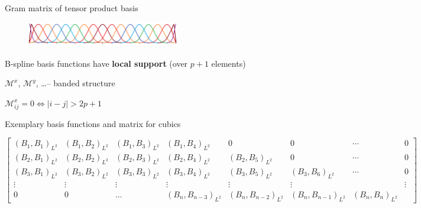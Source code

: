 \documentclass[c]{beamer}
\newcommand{\Prod}[2]{(#1, #2)_{L^2}}
\begin{document}
\begin{frame}{Gram matrix of tensor product basis}

\begin{figure}
  \centering
  \includegraphics[width=0.6\textwidth]{img/Bsplines}
\end{figure}

B-spline basis functions have \textbf{local support} (over $p+1$ elements) 

$\mathcal{M}^x$, $\mathcal{M}^y$, \ldots -- banded structure

$\mathcal{M}^x_{ij} = 0 \iff |i - j| > 2p + 1$

Exemplary basis functions and matrix for cubics

\begin{tiny}
\begin{equation*}
	\begin{bmatrix}
    \Prod{B_1}{B_1} & \Prod{B_1}{B_2} & \Prod{B_1}{B_3} & \Prod{B_1}{B_4} & 0 & 0 & \cdots & 0 \\
    \Prod{B_2}{B_1} & \Prod{B_2}{B_2} & \Prod{B_2}{B_3} & \Prod{B_2}{B_4} & \Prod{B_2}{B_5} & 0 & \cdots & 0 \\
    \Prod{B_3}{B_1} & \Prod{B_3}{B_2} & \Prod{B_3}{B_3} & \Prod{B_3}{B_4} & \Prod{B_3}{B_5} & \Prod{B_3}{B_6} & \cdots & 0 \\
    \vdots & \vdots & \vdots & \vdots &  \vdots & \vdots &  & \vdots\\
    0 & 0 & \ldots & \Prod{B_n}{B_{n-3}}& \Prod{B_n}{B_{n-2}} & \Prod{B_n}{B_{n-1}} & \Prod{B_n}{B_n}
  \end{bmatrix}
\end{equation*}
\end{tiny}

\end{frame}




\end{document}
